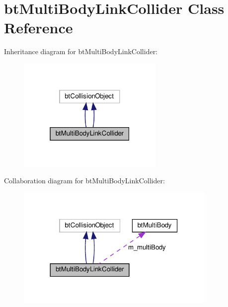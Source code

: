 \hypertarget{classbtMultiBodyLinkCollider}{}\section{bt\+Multi\+Body\+Link\+Collider Class Reference}
\label{classbtMultiBodyLinkCollider}


Inheritance diagram for bt\+Multi\+Body\+Link\+Collider\+:
\nopagebreak
\begin{figure}[H]
\begin{center}
\leavevmode
\includegraphics[width=199pt]{classbtMultiBodyLinkCollider__inherit__graph}
\end{center}
\end{figure}


Collaboration diagram for bt\+Multi\+Body\+Link\+Collider\+:
\nopagebreak
\begin{figure}[H]
\begin{center}
\leavevmode
\includegraphics[width=272pt]{classbtMultiBodyLinkCollider__coll__graph}
\end{center}
\end{figure}
